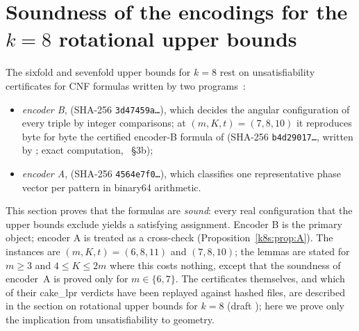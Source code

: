 \providecommand{\py}[1]{{\upshape\nolinkurl{#1}}}
\providecommand{\sgn}{\operatorname{sgn}}
\providecommand{\dirv}{\operatorname{dir}}

\section{Soundness of the encodings for the \texorpdfstring{$k=8$}{k=8} rotational upper bounds}\label{k8s:sec}

The sixfold and sevenfold upper bounds for $k=8$ rest on unsatisfiability certificates for CNF formulas written by
two programs~\cite{Supp}:
\begin{itemize}
\item \emph{encoder B},  (SHA-256 \texttt{3d47459a\dots}), which decides the angular
configuration of every triple by integer comparisons; at $(m,K,t)=(7,8,10)$ it reproduces byte for byte the certified
encoder-B formula of  (SHA-256 \texttt{b4d29017\dots}, written by ; exact
computation, ~\S3b);
\item \emph{encoder A},  (SHA-256 \texttt{4564e7f0\dots}), which classifies one representative
phase vector per pattern in binary64 arithmetic.
\end{itemize}
This section proves that the formulas are \emph{sound}: every real configuration that the upper bounds exclude
yields a satisfying assignment. Encoder B is the primary object; encoder A is treated as a cross-check
(Proposition~\ref{k8s:prop:A}). The instances are $(m,K,t)=(6,8,11)$ and $(7,8,10)$; the lemmas are stated for $m\ge3$
and $4\le K\le 2m$ where this costs nothing, except that the soundness of encoder~A is proved only for
$m\in\{6,7\}$. The certificates themselves, and which of their cake\_lpr verdicts have
been replayed against hashed files, are described in the section on rotational upper bounds for $k=8$ (draft
); here we prove only the implication from unsatisfiability to geometry.

